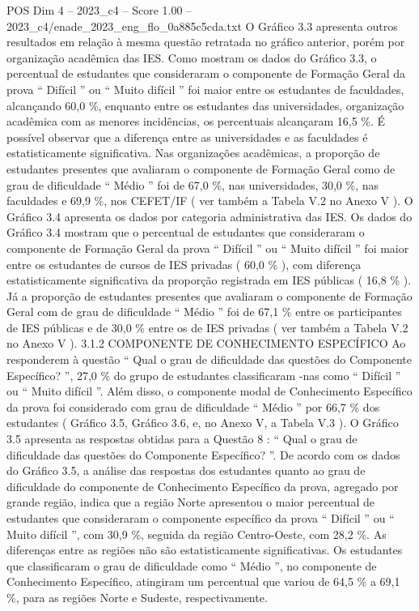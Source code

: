 \begin{textsample}{POS Dim 4 – 2023\_c4 – Score 1.00 – 2023\_c4/enade\_2023\_eng\_flo\_0a885c5cda.txt}
O Gráfico 3.3 apresenta outros resultados em relação à mesma questão retratada no gráfico anterior, porém por organização acadêmica das IES.
Como mostram os dados do Gráfico 3.3, o percentual de estudantes que consideraram o componente de Formação Geral da prova “ Difícil ” ou “ Muito difícil ” foi maior entre os estudantes de faculdades, alcançando 60,0 \%, enquanto entre os estudantes das universidades, organização acadêmica com as menores incidências, os percentuais alcançaram 16,5 \%.
É possível observar que a diferença entre as universidades e as faculdades é estatisticamente significativa.
Nas organizações acadêmicas, a proporção de estudantes presentes que avaliaram o componente de Formação Geral como de grau de dificuldade “ Médio ” foi de 67,0 \%, nas universidades, 30,0 \%, nas faculdades e 69,9 \%, nos CEFET/IF ( ver também a Tabela V.2 no Anexo V ).
O Gráfico 3.4 apresenta os dados por categoria administrativa das IES.
Os dados do Gráfico 3.4 mostram que o percentual de estudantes que consideraram o componente de Formação Geral da prova “ Difícil ” ou “ Muito difícil ” foi maior entre os estudantes de cursos de IES privadas ( 60,0 \% ), com diferença estatisticamente significativa da proporção registrada em IES públicas ( 16,8 \% ).
Já a proporção de estudantes presentes que avaliaram o componente de Formação Geral com de grau de dificuldade “ Médio ” foi de 67,1 \% entre os participantes de IES públicas e de 30,0 \% entre os de IES privadas ( ver também a Tabela V.2 no Anexo V ). 3.1.2 COMPONENTE DE CONHECIMENTO ESPECÍFICO Ao responderem à questão “ Qual o grau de dificuldade das questões do Componente Específico? ”, 27,0 \% do grupo de estudantes classificaram -nas como “ Difícil ” ou “ Muito difícil ”.
Além disso, o componente modal de Conhecimento Específico da prova foi considerado com grau de dificuldade “ Médio ” por 66,7 \% dos estudantes ( Gráfico 3.5, Gráfico 3.6, e, no Anexo V, a Tabela V.3 ).
O Gráfico 3.5 apresenta as respostas obtidas para a Questão 8 : “ Qual o grau de dificuldade das questões do Componente Específico? ”.
De acordo com os dados do Gráfico 3.5, a análise das respostas dos estudantes quanto ao grau de dificuldade do componente de Conhecimento Específico da prova, agregado por grande região, indica que a região Norte apresentou o maior percentual de estudantes que consideraram o componente específico da prova “ Difícil ” ou “ Muito difícil ”, com 30,9 \%, seguida da região Centro-Oeste, com 28,2 \%.
As diferenças entre as regiões não são estatisticamente significativas.
Os estudantes que classificaram o grau de dificuldade como “ Médio ”, no componente de Conhecimento Específico, atingiram um percentual que variou de 64,5 \% a 69,1 \%, para as regiões Norte e Sudeste, respectivamente.

\end{textsample}
